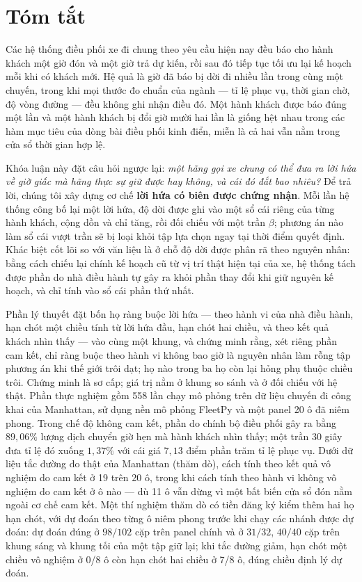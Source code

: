 \chapter*{Tóm tắt}

Các hệ thống điều phối xe đi chung theo yêu cầu hiện nay đều báo cho hành khách một giờ đón
và một giờ trả dự kiến, rồi sau đó tiếp tục tối ưu lại kế hoạch mỗi khi có khách mới. Hệ quả
là giờ đã báo bị dời đi nhiều lần trong cùng một chuyến, trong khi mọi thước đo chuẩn của
ngành --- tỉ lệ phục vụ, thời gian chờ, độ vòng đường --- đều không ghi nhận điều đó. Một
hành khách được báo đúng một lần và một hành khách bị đổi giờ mười hai lần là giống hệt nhau
trong các hàm mục tiêu của dòng bài điều phối kinh điển, miễn là cả hai vẫn nằm trong cửa sổ
thời gian hợp lệ.

Khóa luận này đặt câu hỏi ngược lại: \emph{một hãng gọi xe chung có thể đưa ra lời hứa về giờ
giấc mà hãng thực sự giữ được hay không, và cái đó đắt bao nhiêu?} Để trả lời, chúng tôi xây
dựng cơ chế \textbf{lời hứa có biên được chứng nhận}. Mỗi lần hệ thống công bố lại một lời
hứa, độ dời được ghi vào một sổ cái riêng của từng hành khách, cộng dồn và chỉ tăng, rồi đối
chiếu với một trần $\beta$; phương án nào làm sổ cái vượt trần sẽ bị loại khỏi tập lựa chọn
ngay tại thời điểm quyết định. Khác biệt cốt lõi so với văn liệu là ở chỗ độ dời được phân rã
theo nguyên nhân: bằng cách chiếu lại chính kế hoạch cũ từ vị trí thật hiện tại của xe, hệ
thống tách được phần do nhà điều hành tự gây ra khỏi phần thay đổi khi giữ nguyên kế hoạch, và
chỉ tính vào sổ cái phần thứ nhất.

Phần lý thuyết đặt bốn họ ràng buộc lời hứa --- theo hành vi của nhà điều hành, hạn chót một
chiều tính từ lời hứa đầu, hạn chót hai chiều, và theo kết quả khách nhìn thấy --- vào cùng một
khung, và chứng minh rằng, xét riêng phần cam kết, chỉ ràng buộc theo hành vi không bao giờ là
nguyên nhân làm rỗng tập phương án khi thế giới trôi dạt; họ nào trong ba họ còn lại hỏng phụ
thuộc chiều trôi. Chứng minh là sơ cấp; giá trị nằm ở khung so sánh và ở đối chiếu với hệ thật.
Phần thực nghiệm gồm 558 lần chạy mô phỏng trên dữ liệu chuyến đi công khai của Manhattan, sử
dụng nền mô phỏng FleetPy và một panel 20 ô đã niêm phong. Trong chế độ không cam kết, phần do
chính bộ điều phối gây ra bằng $89{,}06\%$ lượng dịch chuyển giờ hẹn mà hành khách nhìn thấy; một
trần 30 giây đưa tỉ lệ đó xuống $1{,}37\%$ với cái giá $7{,}13$ điểm phần trăm tỉ lệ phục vụ. Dưới
dữ liệu tắc đường đo thật của Manhattan (thăm dò), cách tính theo kết quả vô nghiệm do cam kết ở
19 trên 20 ô, trong khi cách tính theo hành vi không vô nghiệm do cam kết ở ô nào --- dù 11 ô vẫn
dừng vì một bất biến cửa sổ đón nằm ngoài cơ chế cam kết. Một thí nghiệm thăm dò có tiền đăng ký
kiểm thêm hai họ hạn chót, với dự đoán theo từng ô niêm phong trước khi chạy các nhánh được dự
đoán: dự đoán đúng ở
$98/102$ cặp trên panel chính và ở $31/32$, $40/40$ cặp trên khung sáng và khung tối của một tập giữ
lại; khi tắc đường giảm, hạn chót một chiều vô nghiệm ở 0/8 ô còn hạn chót hai chiều ở 7/8 ô, đúng
chiều định lý dự đoán.

